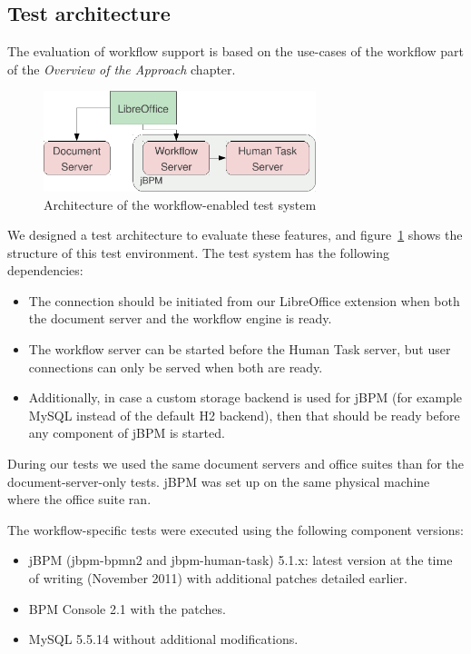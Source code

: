 \subsection*{Test architecture}

The evaluation of workflow support is based on the use-cases of the workflow
part of the \emph{Overview of the Approach} chapter.

\begin{figure}[H]
\centering
\includegraphics[width=300px,keepaspectratio]{test-arch-wf.pdf}
\caption{Architecture of the workflow-enabled test system}
\label{fig:test-arch-wf}
\end{figure}

We designed a test architecture to evaluate these features, and
figure~\ref{fig:test-arch-wf} shows the structure of this test environment. The
test system has the following dependencies:

\begin{itemize}
\item The connection should be initiated from our LibreOffice extension when
both the document server and the workflow engine is ready.
\item The workflow server can be started before the Human Task server, but user
connections can only be served when both are ready.
\item Additionally, in case a custom storage backend is used for jBPM (for
example MySQL instead of the default H2 backend), then that should be ready
before any component of jBPM is started.
\end{itemize}

During our tests we used the same document servers and office suites than for
the document-server-only tests. jBPM was set up on the same physical machine
where the office suite ran.

The workflow-specific tests were executed using the following component versions:

\begin{itemize}
\item jBPM (jbpm-bpmn2 and jbpm-human-task) 5.1.x: latest version at the time
of writing (November 2011) with additional patches detailed earlier.
\item BPM Console 2.1 with the patches.
\item MySQL 5.5.14 without additional modifications.
\end{itemize}

